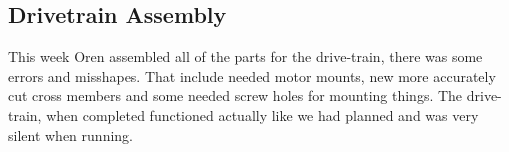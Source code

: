 \documentclass{article}
\begin{document}
\subsection{Drivetrain Assembly}
This week Oren assembled all of the parts for the drive-train, there was some errors and misshapes. That include needed motor mounts, new more accurately cut cross members and some needed screw holes for mounting things. The drive-train, when completed functioned actually like we had planned and was very silent when running.    
\end{document}
